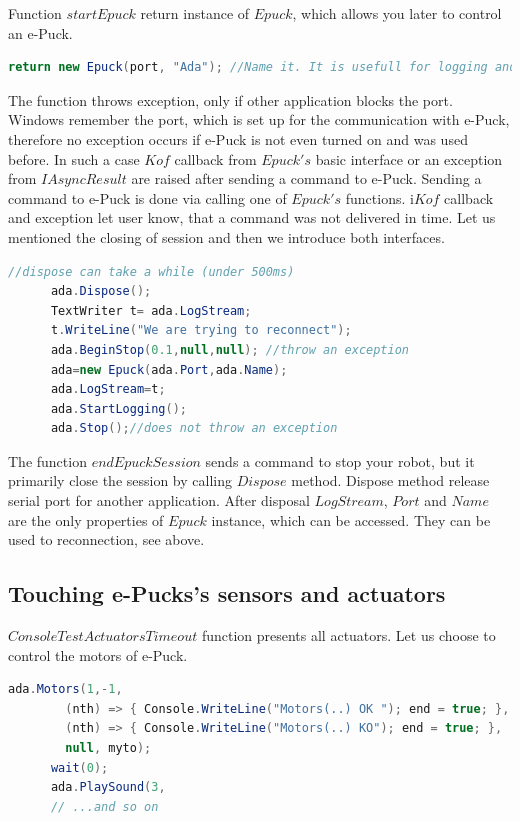 \documentclass[12pt,notitlepage]{report}
\begin{document}
	Function $startEpuck$ return instance of $Epuck$, which allows you later to control an e-Puck.
\begin{lstlisting}[language=cs]
      return new Epuck(port, "Ada"); //Name it. It is usefull for logging and debugging.
\end{lstlisting}
	The function throws exception, only if other application blocks the port. Windows remember
	the port, which is set up for the communication with e-Puck, therefore
	no exception occurs if e-Puck is not even turned on and was used before.
	In such a case $Kof$ callback from $Epuck's$ basic interface or an exception	
	from $IAsyncResult$ are raised after sending a command to e-Puck.
	Sending a command to e-Puck is done via calling one of $Epuck's$ functions.
	i$Kof$ callback and exception let user know, that a command was not delivered in time.
	Let us mentioned the closing of session and then we introduce both interfaces.
\begin{lstlisting}[language=cs]
      //dispose can take a while (under 500ms)
      ada.Dispose();
      TextWriter t= ada.LogStream;
      t.WriteLine("We are trying to reconnect");
      ada.BeginStop(0.1,null,null); //throw an exception
      ada=new Epuck(ada.Port,ada.Name);
      ada.LogStream=t;
      ada.StartLogging();
      ada.Stop();//does not throw an exception
\end{lstlisting}
	The function $endEpuckSession$ sends a command to stop your robot, but it primarily close the session by calling $Dispose$ method.
	Dispose method release serial port for another application. After disposal $LogStream$, $Port$ and $Name$ are the 
	only properties of $Epuck$ instance, which can be accessed. They can be used to reconnection, see above.

\subsection{Touching e-Pucks's sensors and actuators}\label{sec:touching}
	$ConsoleTestActuatorsTimeout$ function presents all actuators. Let us choose to control the motors of e-Puck.
\begin{lstlisting}[language=cs]
      ada.Motors(1,-1,
        (nth) => { Console.WriteLine("Motors(..) OK "); end = true; },
        (nth) => { Console.WriteLine("Motors(..) KO"); end = true; },
        null, myto);
      wait(0);
      ada.PlaySound(3,
      // ...and so on
\end{lstlisting}
	
\end{document}
